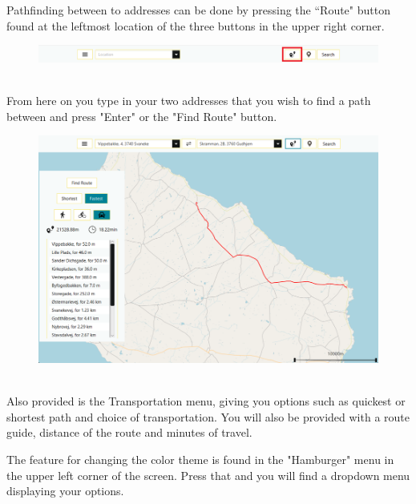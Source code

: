Pathfinding between to addresses can be done by pressing the “Route" button found at the leftmost location of the three buttons in the upper right corner. 
\begin{figure}[ht]%
  \centering
  \includegraphics[width=14.5cm]{docs/material/UserManual_RouteButton.png}%
\end{figure}\\
From here on you type in your two addresses that you wish to find a path between and press "Enter" or the "Find Route" button.
\begin{figure}[ht]%
  \centering
  \includegraphics[width=13.5cm]{docs/material/UserManual_Pathfinding.png}%
\end{figure}\\
Also provided is the Transportation menu, giving you options such as quickest or shortest path and choice of transportation. You will also be provided with a route guide, distance of the route and minutes of travel.

The feature for changing the color theme is found in the "Hamburger" menu in the upper left corner of the screen. Press that and you will find a dropdown menu displaying your options. 
